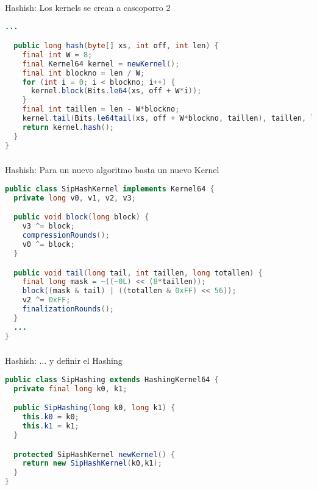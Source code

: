 \begin{frame}[fragile]
  \frametitle{\ft}
  \begin{block}{Hashish: Los kernels se crean a cascoporro 2}
    \begin{lstlisting}[language=java]
  ...

  public long hash(byte[] xs, int off, int len) {
    final int W = 8;
    final Kernel64 kernel = newKernel();
    final int blockno = len / W;
    for (int i = 0; i < blockno; i++) {
      kernel.block(Bits.le64(xs, off + W*i));
    }
    final int taillen = len - W*blockno;
    kernel.tail(Bits.le64tail(xs, off + W*blockno, taillen), taillen, len);
    return kernel.hash();
  }
}
    \end{lstlisting}
  \end{block}
\end{frame}


\begin{frame}[fragile]
  \frametitle{\ft}
  \begin{block}{Hashish: Para un nuevo algoritmo basta un nuevo Kernel}
    \begin{lstlisting}[language=java]
public class SipHashKernel implements Kernel64 {
  private long v0, v1, v2, v3;

  public void block(long block) {
    v3 ^= block;
    compressionRounds();
    v0 ^= block;
  }

  public void tail(long tail, int taillen, long totallen) {
    final long mask = ~((~0L) << (8*taillen));
    block((mask & tail) | ((totallen & 0xFF) << 56));
    v2 ^= 0xFF;
    finalizationRounds();
  }
  ...
}
    \end{lstlisting}
  \end{block}
\end{frame}


\begin{frame}[fragile]
  \frametitle{\ft}
  \begin{block}{Hashish: ... y definir el Hashing}
    \begin{lstlisting}[language=java]
public class SipHashing extends HashingKernel64 {
  private final long k0, k1;

  public SipHashing(long k0, long k1) {
    this.k0 = k0;
    this.k1 = k1;
  }

  protected SipHashKernel newKernel() {
    return new SipHashKernel(k0,k1);
  }
}
    \end{lstlisting}
  \end{block}
\end{frame}


